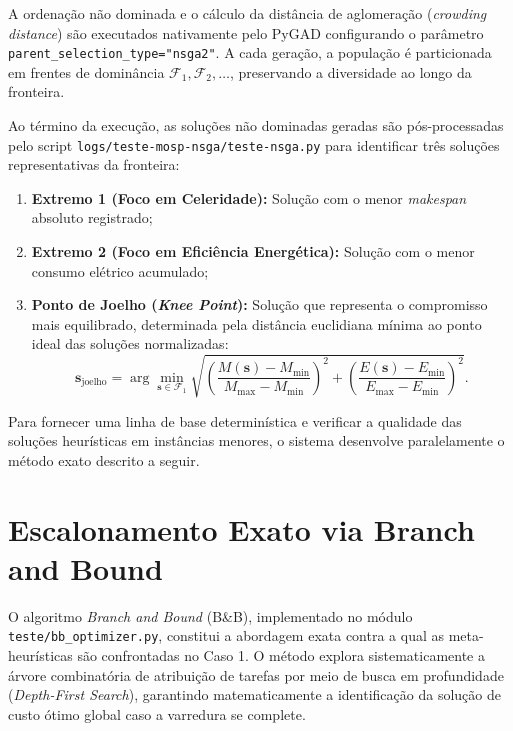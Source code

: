 A ordenação não dominada e o cálculo da distância de aglomeração (\textit{crowding distance}) são executados nativamente pelo PyGAD configurando o parâmetro \texttt{parent\_selection\_type="nsga2"}. A cada geração, a população é particionada em frentes de dominância $\mathcal{F}_1, \mathcal{F}_2, \dots$, preservando a diversidade ao longo da fronteira.

Ao término da execução, as soluções não dominadas geradas são pós-processadas pelo script \texttt{logs/teste-mosp-nsga/teste-nsga.py} para identificar três soluções representativas da fronteira:
\begin{enumerate}
    \item \textbf{Extremo 1 (Foco em Celeridade):} Solução com o menor \textit{makespan} absoluto registrado;
    \item \textbf{Extremo 2 (Foco em Eficiência Energética):} Solução com o menor consumo elétrico acumulado;
    \item \textbf{Ponto de Joelho (\textit{Knee Point}):} Solução que representa o compromisso mais equilibrado, determinada pela distância euclidiana mínima ao ponto ideal das soluções normalizadas:
    \begin{equation}\label{eq:knee_point}
    \mathbf{s}_{\text{joelho}} = \arg\min_{\mathbf{s} \in \mathcal{F}_1} \sqrt{ \left(\frac{M(\mathbf{s}) - M_{\text{min}}}{M_{\text{max}} - M_{\text{min}}}\right)^2 + \left(\frac{E(\mathbf{s}) - E_{\text{min}}}{E_{\text{max}} - E_{\text{min}}}\right)^2 }.
    \end{equation}
\end{enumerate}

Para fornecer uma linha de base determinística e verificar a qualidade das soluções heurísticas em instâncias menores, o sistema desenvolve paralelamente o método exato descrito a seguir.

\section{Escalonamento Exato via Branch and Bound}\label{sec:dev_bb}

O algoritmo \textit{Branch and Bound} (B\&B), implementado no módulo \texttt{teste/bb\_optimizer.py}, constitui a abordagem exata contra a qual as meta-heurísticas são confrontadas no Caso 1. O método explora sistematicamente a árvore combinatória de atribuição de tarefas por meio de busca em profundidade (\textit{Depth-First Search}), garantindo matematicamente a identificação da solução de custo ótimo global caso a varredura se complete.

